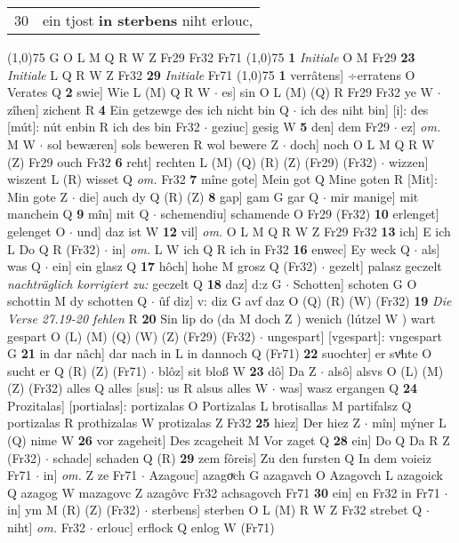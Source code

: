 \documentclass[8pt,a4paper,notitlepage]{article}
\begin{document}
\begin{table}[ht]
\begin{minipage}[t]{0.5\linewidth}
\begin{tabular}{rl}
30 & ein tjost \textbf{in sterbens} niht erlouc,\\ 
\end{tabular}
\scriptsize
\line(1,0){75} \newline
G O L M Q R W Z Fr29 Fr32 Fr71 \newline
\line(1,0){75} \newline
\textbf{1} \textit{Initiale} O M Fr29  \textbf{23} \textit{Initiale} L Q R W Z Fr32  \textbf{29} \textit{Initiale} Fr71  \newline
\line(1,0){75} \newline
\textbf{1} verrâtens] ÷erratens O Verates Q \textbf{2} swie] Wie L (M) Q R W  $\cdot$ es] sin O L (M) (Q) R Fr29 Fr32 ye W  $\cdot$ zîhen] zichent R \textbf{4} Ein getzewge des ich nicht bin Q  $\cdot$ ich des niht bin] [i]: des [mút]: nút enbin R ich des bin Fr32  $\cdot$ geziuc] gesig W \textbf{5} den] dem Fr29  $\cdot$ ez] \textit{om.} M W  $\cdot$ sol bewæren] sols beweren R wol bewere Z  $\cdot$ doch] noch O L M Q R W (Z) Fr29 ouch Fr32 \textbf{6} reht] rechten L (M) (Q) (R) (Z) (Fr29) (Fr32)  $\cdot$ wizzen] wiszent L (R) wisset Q \textit{om.} Fr32 \textbf{7} mîne gote] Mein got Q Mine goten R [Mit]: Min gote Z  $\cdot$ die] auch dy Q (R) (Z) \textbf{8} gap] gam G gar Q  $\cdot$ mir manige] mit manchein Q \textbf{9} mîn] mit Q  $\cdot$ schemendiu] schamende O Fr29 (Fr32) \textbf{10} erlenget] gelenget O  $\cdot$ und] daz ist W \textbf{12} vil] \textit{om.} O L M Q R W Z Fr29 Fr32 \textbf{13} ich] E ich L Do Q R (Fr32)  $\cdot$ in] \textit{om.} L W ich Q R ich in Fr32 \textbf{16} enwec] Ey weck Q  $\cdot$ als] was Q  $\cdot$ ein] ein glasz Q \textbf{17} hôch] hohe M grosz Q (Fr32)  $\cdot$ gezelt] palasz geczelt \textit{nachträglich korrigiert zu:} geczelt Q \textbf{18} daz] d:z G  $\cdot$ Schotten] schoten G O schottin M dy schotten Q  $\cdot$ ûf diz] v: diz G avf daz O (Q) (R) (W) (Fr32) \textbf{19} \textit{Die Verse 27.19-20 fehlen} R  \textbf{20} Sin lip do (da M doch Z ) wenich (lútzel W ) wart gespart O (L) (M) (Q) (W) (Z) (Fr29) (Fr32)  $\cdot$ ungespart] [vgespart]: vngespart G \textbf{21} in dar nâch] dar nach in L in dannoch Q (Fr71) \textbf{22} suochter] er svͦhte O sucht er Q (R) (Z) (Fr71)  $\cdot$ blôz] sit bloß W \textbf{23} dô] Da Z  $\cdot$ alsô] alsvs O (L) (M) (Z) (Fr32) alles Q alles [sus]: us R alsus alles W  $\cdot$ was] wasz ergangen Q \textbf{24} Prozitalas] [portialas]: portizalas O Portizalas L brotisallas M partifalsz Q portizalas R prothizalas W protizalas Z Fr32 \textbf{25} hiez] Der hiez Z  $\cdot$ mîn] mýner L (Q) nime W \textbf{26} vor zageheit] Des zcageheit M Vor zaget Q \textbf{28} ein] Do Q Da R Z (Fr32)  $\cdot$ schade] schaden Q (R) \textbf{29} zem fôreis] Zu den fursten Q In dem voieiz Fr71  $\cdot$ in] \textit{om.} Z ze Fr71  $\cdot$ Azagouc] azagoͮch G azagavch O Azagovch L azagoick Q azagog W mazagovc Z azagôvc Fr32 achsagovch Fr71 \textbf{30} ein] en Fr32 in Fr71  $\cdot$ in] ym M (R) (Z) (Fr32)  $\cdot$ sterbens] sterben O L (M) R W Z Fr32 strebet Q  $\cdot$ niht] \textit{om.} Fr32  $\cdot$ erlouc] erflock Q enlog W (Fr71) \newline

\end{minipage}
\end{table}
\end{document}
